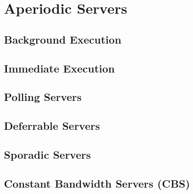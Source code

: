 \chapter{Aperiodic Servers}
\section{Background Execution}
\section{Immediate Execution}
\section{Polling Servers}
\section{Deferrable Servers}
\section{Sporadic Servers}
\section{Constant Bandwidth Servers (CBS)}